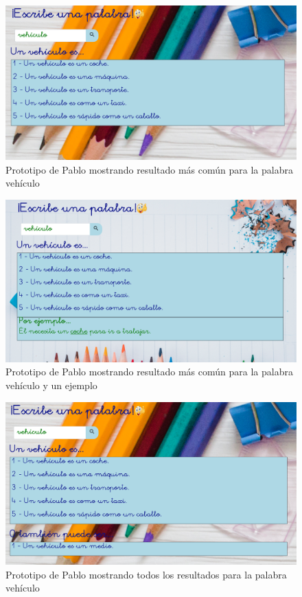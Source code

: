 \begin{figure}[!t]
	\includegraphics[width=.8\textwidth]{Imagenes/Bitmap/Mockups/mockup1_pablo}
	\centering
	\caption{Prototipo de Pablo mostrando resultado más común para la palabra vehículo}
	\label{fig:mockup1pablo}
\end{figure}

\begin{figure}[!t]
	\includegraphics[width=.8\textwidth]{Imagenes/Bitmap/Mockups/mockup2_pablo}
	\centering
	\caption{Prototipo de Pablo mostrando resultado más común para la palabra vehículo y un ejemplo}
	\label{fig:mockup2pablo}
\end{figure}

\begin{figure}[!t]
	\includegraphics[width=.8\textwidth]{Imagenes/Bitmap/Mockups/mockup3_pablo}
	\centering
	\caption{Prototipo de Pablo mostrando todos los resultados para la palabra vehículo}
	\label{fig:mockup3pablo}
\end{figure}


